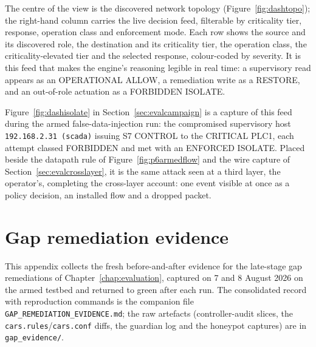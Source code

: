 The centre of the view is the discovered network topology (Figure~\ref{fig:dashtopo}); the right-hand column carries the live decision feed, filterable by criticality tier, response, operation class and enforcement mode. Each row shows the source and its discovered role, the destination and its criticality tier, the operation class, the criticality-elevated tier and the selected response, colour-coded by severity. It is this feed that makes the engine's reasoning legible in real time: a supervisory read appears as an OPERATIONAL ALLOW, a remediation write as a RESTORE, and an out-of-role actuation as a FORBIDDEN ISOLATE.

Figure~\ref{fig:dashisolate} in Section~\ref{sec:evalcampaign} is a capture of this feed during the armed false-data-injection run: the compromised supervisory host \texttt{192.168.2.31 (scada)} issuing S7 CONTROL to the CRITICAL PLC1, each attempt classed FORBIDDEN and met with an ENFORCED ISOLATE. Placed beside the datapath rule of Figure~\ref{fig:p6armedflow} and the wire capture of Section~\ref{sec:evalcrosslayer}, it is the same attack seen at a third layer, the operator's, completing the cross-layer account: one event visible at once as a policy decision, an installed flow and a dropped packet.

\FloatBarrier
\section{Gap remediation evidence}
\label{appx:gapevidence}

This appendix collects the fresh before-and-after evidence for the late-stage gap remediations of Chapter~\ref{chap:evaluation}, captured on 7 and 8 August 2026 on the armed testbed and returned to green after each run. The consolidated record with reproduction commands is the companion file \texttt{GAP\_REMEDIATION\_EVIDENCE.md}; the raw artefacts (controller-audit slices, the \texttt{cars.rules}/\texttt{cars.conf} diffs, the guardian log and the honeypot captures) are in \texttt{gap\_evidence/}.

